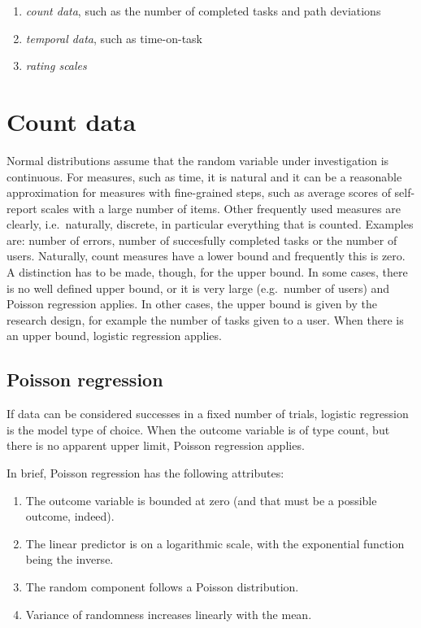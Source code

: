 \documentclass[]{svmono}
\providecommand{\tightlist}{%
  \setlength{\itemsep}{0pt}\setlength{\parskip}{0pt}}
\begin{document}
\begin{enumerate}
\def\labelenumi{\arabic{enumi}.}
\tightlist
\item
  \emph{count data}, such as the number of completed tasks and path
  deviations
\item
  \emph{temporal data}, such as time-on-task
\item
  \emph{rating scales}
\end{enumerate}

\section{Count data}\label{count_data}

Normal distributions assume that the random variable under investigation
is continuous. For measures, such as time, it is natural and it can be a
reasonable approximation for measures with fine-grained steps, such as
average scores of self-report scales with a large number of items. Other
frequently used measures are clearly, i.e.~naturally, discrete, in
particular everything that is counted. Examples are: number of errors,
number of succesfully completed tasks or the number of users. Naturally,
count measures have a lower bound and frequently this is zero. A
distinction has to be made, though, for the upper bound. In some cases,
there is no well defined upper bound, or it is very large (e.g.~number
of users) and Poisson regression applies. In other cases, the upper
bound is given by the research design, for example the number of tasks
given to a user. When there is an upper bound, logistic regression
applies.

\subsection{Poisson regression}\label{poisson-regression}

If data can be considered successes in a fixed number of trials,
logistic regression is the model type of choice. When the outcome
variable is of type count, but there is no apparent upper limit, Poisson
regression applies.

In brief, Poisson regression has the following attributes:

\begin{enumerate}
\def\labelenumi{\arabic{enumi}.}
\tightlist
\item
  The outcome variable is bounded at zero (and that must be a possible
  outcome, indeed).
\item
  The linear predictor is on a logarithmic scale, with the exponential
  function being the inverse.
\item
  The random component follows a Poisson distribution.
\item
  Variance of randomness increases linearly with the mean.
\end{enumerate}
\end{document}
